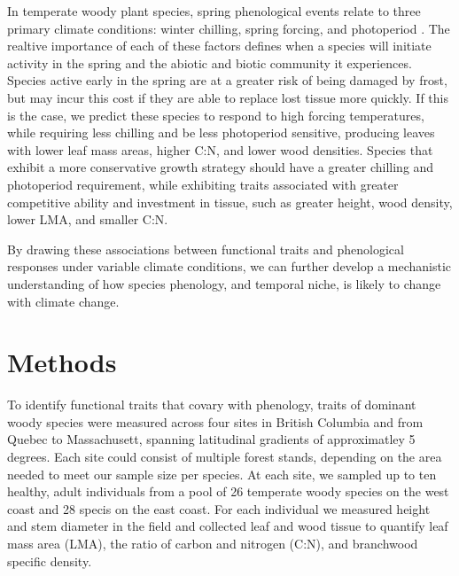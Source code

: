 \documentclass[11pt,a4paper,oneside]{article}
\begin{document}
\par In temperate woody plant species, spring phenological events relate to three primary climate conditions: winter chilling, spring forcing, and photoperiod \cite{Chuine2016}. The realtive importance of each of these factors defines when a species will initiate activity in the spring and the abiotic and biotic community it experiences. Species active early in the spring are at a greater risk of being damaged by frost, but may incur this cost if they are able to replace lost tissue more quickly. If this is the case, we predict these species to respond to high forcing temperatures, while requiring less chilling and be less photoperiod sensitive, producing leaves with lower leaf mass areas, higher C:N, and lower wood densities. Species that exhibit a more conservative growth strategy should have a greater chilling and photoperiod requirement, while exhibiting traits associated with greater competitive ability and investment in tissue, such as greater height, wood density, lower LMA, and smaller C:N.

By drawing these associations between functional traits and phenological responses under variable climate conditions, we can further develop a mechanistic understanding of how species phenology, and temporal niche, is likely to change with climate change. 

\section*{Methods}
\par To identify functional traits that covary with phenology, traits of dominant woody species were measured across four sites in British Columbia and from Quebec to Massachusett, spanning latitudinal gradients of approximatley 5 degrees. Each site could consist of multiple forest stands, depending on the area needed to meet our sample size per species.  At each site, we sampled up to ten healthy, adult individuals from a pool of 26 temperate woody species on the west coast and 28 specis on the east coast. For each individual we measured height and stem diameter in the field and collected leaf and wood tissue to quantify leaf mass area (LMA), the ratio of carbon and nitrogen (C:N), and branchwood specific density. 
\end{document}
